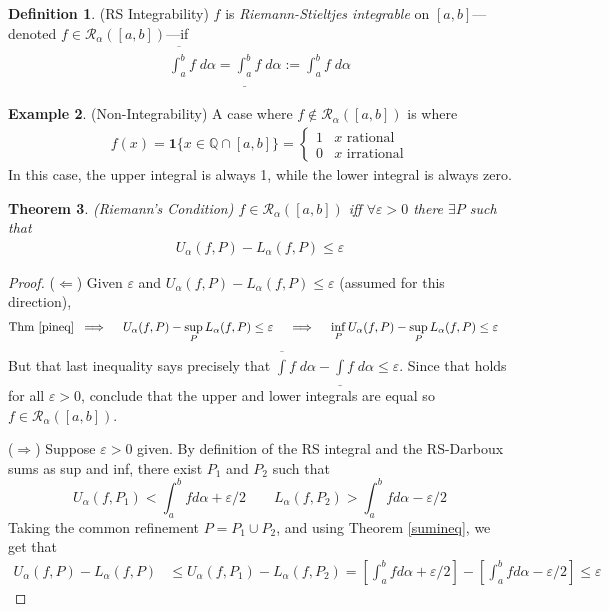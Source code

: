 \documentclass[12pt]{book}
\numberwithin{equation}{section} %
\theoremstyle{plain}
\newtheorem{thm}{Theorem}[section]
\theoremstyle{definition}
\newtheorem{defn}[thm]{Definition}
\newtheorem{ex}[thm]{Example}
\theoremstyle{remark}
\newcommand{\sR}{\mathscr{R}}
\begin{document}
\begin{defn}(RS Integrability)
$f$ is \emph{Riemann-Stieltjes integrable} on $[a,b]$---denoted
$f \in \mathscr{R}_\alpha([a,b])$---if
\begin{align*}
  \overline{\int^b_a} f \;d\alpha  =
  \underline{\int^b_a} f \;d\alpha
  := {\int^b_a} f \;d\alpha
\end{align*}
\end{defn}

\begin{ex}(Non-Integrability)
A case where $f \notin \mathscr{R}_\alpha([a,b])$ is where
\begin{align*}
  f(x) = \mathbf{1}\{x\in \mathbb{Q}\cap [a,b]\}
    =\begin{cases} 1 & x\text{ rational} \\
        0 & x\text{ irrational} \end{cases}
\end{align*}
In this case, the upper integral is always 1, while the lower integral
is always zero.
\end{ex}

\begin{thm}
\emph{(Riemann's Condition)}
\label{riemcond}
$f \in \mathscr{R}_\alpha([a,b])$ iff
$\forall\varepsilon>0$ there $\exists P$ such that
\begin{align*}
  U_\alpha(f,P) - L_\alpha(f,P) \leq \varepsilon
\end{align*}
\end{thm}
\begin{proof}
($\Leftarrow$)
Given $\varepsilon$ and
$U_\alpha(f,P) - L_\alpha(f,P) \leq \varepsilon$
(assumed for this direction),
\begin{align*}
  \text{Thm~\ref{pineq}}\;\implies\quad
  U_\alpha(f,P) - \sup_P L_\alpha(f,P) &\leq \varepsilon
  \quad \implies\quad
  \inf_P U_\alpha(f,P) - \sup_P L_\alpha(f,P) \leq \varepsilon
\end{align*}
But that last inequality says precisely that
$\overline{\int} f\;d\alpha -
\underline{\int}f\;d\alpha\leq\varepsilon$.
Since that holds for all $\varepsilon>0$, conclude that the upper and
lower integrals are equal so $f\in\sR_\alpha([a,b])$.

($\Rightarrow$)
Suppose $\varepsilon>0$ given.
By definition of the RS integral and the RS-Darboux sums as sup and
inf, there exist $P_1$ and $P_2$ such that
\begin{equation}
    \label{p1}
    U_\alpha(f,P_1) < \int^b_a f d\alpha + \varepsilon/2 \qquad
    L_\alpha(f,P_2) > \int^b_a f d\alpha - \varepsilon/2
\end{equation}
Taking the common refinement $P=P_1\cup P_2$, and using Theorem
\ref{sumineq}, we get that
\begin{align*}
    U_\alpha(f,P) - L_\alpha(f,P) &\leq
    U_\alpha(f,P_1) - L_\alpha(f,P_2)
    = \left[\int^b_a f d\alpha + \varepsilon/2\right] -
        \left[\int^b_a f d\alpha -\varepsilon/2  \right]
    \leq \varepsilon
\end{align*}
\end{proof}
\end{document}
